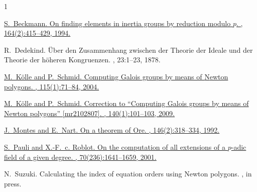 \documentclass{article}
\theoremstyle{definition}
\theoremstyle{remark}
\numberwithin{equation}{section}
\begin{document}
\begin{thebibliography}{1}

\href{https://doi.org/10.1006/jabr.1994.1067}
{S.~Beckmann.
\newblock On finding elements in inertia groups by reduction modulo {$p$}.
, 164(2):415--429, 1994.}

R.~Dedekind.
\newblock Über den {Z}usammenhang zwischen der {T}heorie der {I}deale und der
  {T}heorie der höheren {K}ongruenzen.
, 23:1--23, 1878.

\href{https://doi.org/10.4064/aa115-1-6}
{M.~K\"olle and P.~Schmid.
\newblock Computing {G}alois groups by means of {N}ewton polygons.
, 115(1):71--84, 2004.}

\href{https://doi.org/10.4064/aa140-1-7}
{M.~K\"olle and P.~Schmid.
\newblock Correction to ``{C}omputing {G}alois groups by means of {N}ewton
  polygons'' [mr2102807].
, 140(1):101--103, 2009.}

\href{https://doi.org/10.1016/0021-8693(92)90071-S}
{J.~Montes and E.~Nart.
\newblock On a theorem of {O}re.
, 146(2):318--334, 1992.}

\href{https://doi.org/10.1090/S0025-5718-01-01306-0}
{S.~Pauli and X.-F.~c. Roblot.
\newblock On the computation of all extensions of a {$p$}-adic field of a given degree.
, 70(236):1641--1659, 2001.}

N.~Suzuki.
\newblock Calculating the index of equation orders using Newton polygons.
, in press.

\end{thebibliography}
\end{document}
